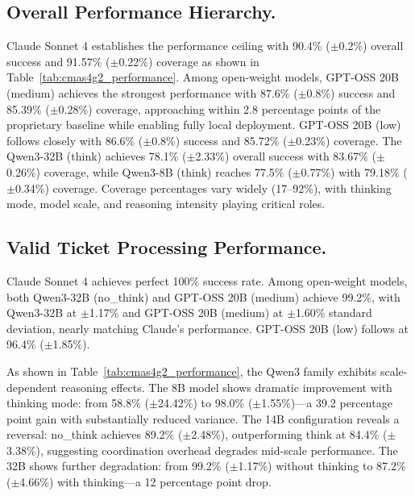 \documentclass[runningheads]{llncs}
\begin{document}
\subsection{Overall Performance Hierarchy.}
Claude Sonnet 4 establishes the performance ceiling with 90.4\% ($\pm$0.2\%) overall success and 91.57\% ($\pm$0.22\%) coverage as shown in Table~\ref{tab:cmas4g2_performance}. Among open-weight models, GPT-OSS 20B (medium) achieves the strongest performance with 87.6\% ($\pm$0.8\%) success and 85.39\% ($\pm$0.28\%) coverage, approaching within 2.8 percentage points of the proprietary baseline while enabling fully local deployment. GPT-OSS 20B (low) follows closely with 86.6\% ($\pm$0.8\%) success and 85.72\% ($\pm$0.23\%) coverage.
The Qwen3-32B (think) achieves 78.1\% ($\pm$2.33\%) overall success with 83.67\% ($\pm$0.26\%) coverage, while Qwen3-8B (think) reaches 77.5\% ($\pm$0.77\%) with 79.18\% ($\pm$0.34\%) coverage. Coverage percentages vary widely (17--92\%), with thinking mode, model scale, and reasoning intensity playing critical roles.

\subsection{Valid Ticket Processing Performance.}
\label{sec:valid-ticket-processing}
Claude Sonnet 4 achieves perfect 100\% success rate. Among open-weight models, both Qwen3-32B (no\_think) and GPT-OSS 20B (medium) achieve 99.2\%, with Qwen3-32B at $\pm$1.17\% and GPT-OSS 20B (medium) at $\pm$1.60\% standard deviation, nearly matching Claude's performance. GPT-OSS 20B (low) follows at 96.4\% ($\pm$1.85\%).

As shown in Table~\ref{tab:cmas4g2_performance}, the Qwen3 family exhibits scale-dependent reasoning effects. The 8B model shows dramatic improvement with thinking mode: from 58.8\% ($\pm$24.42\%) to 98.0\% ($\pm$1.55\%)---a 39.2 percentage point gain with substantially reduced variance. The 14B configuration reveals a reversal: no\_think achieves 89.2\% ($\pm$2.48\%), outperforming think at 84.4\% ($\pm$3.38\%), suggesting coordination overhead degrades mid-scale performance. The 32B shows further degradation: from 99.2\% ($\pm$1.17\%) without thinking to 87.2\% ($\pm$4.66\%) with thinking---a 12 percentage point drop.
\end{document}
